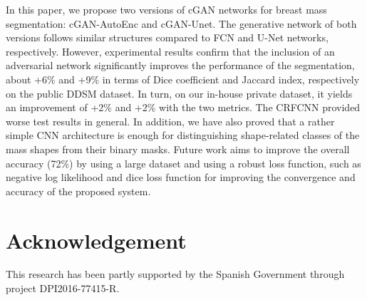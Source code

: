 \documentclass[runningheads,a4paper]{llncs}
\begin{document}
In this paper, we propose two versions of cGAN networks for breast mass segmentation: cGAN-AutoEnc and cGAN-Unet. The generative network of both versions follows similar structures compared to FCN and U-Net networks, respectively. However, experimental results confirm that the inclusion of an adversarial network significantly improves the performance of the segmentation, about +6\% and +9\% in terms of Dice coefficient and Jaccard index, respectively on the public DDSM dataset. In turn, on our in-house private dataset, it yields an improvement of +2\% and +2\% with the two metrics. The CRFCNN provided worse test results in general. In addition, we have also proved that a rather simple CNN architecture is enough for distinguishing shape-related classes of the mass shapes from their binary masks. Future work aims to improve the overall accuracy (72\%) by using a large dataset and using a robust loss function, such as negative log likelihood and dice loss function for improving the convergence and accuracy of the proposed system.

\section*{Acknowledgement}
This research has been partly supported by the Spanish Government through project DPI2016-77415-R.



\end{document}
